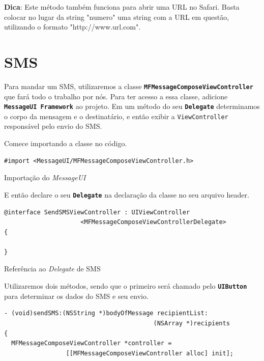 \documentclass[a4paper,12pt,brazil,doubleside]{book}
\begin{document}
\begin{singlespace}
\begin{framed}

\textbf{Dica}: Este método também funciona para abrir uma URL no Safari. Basta colocar no lugar da string "numero" uma string com a URL em questão, utilizando o formato "http://www.url.com".
\end{framed}


\section{SMS}


Para mandar um SMS, utilizaremos a classe \texttt{\textbf{MFMessageComposeViewController}} que fará todo o trabalho por nós. Para ter acesso a essa classe, adicione \texttt{\textbf{MessageUI Framework}} ao projeto. Em um método do seu \texttt{\textbf{Delegate}} determinamos o corpo da mensagem e o destinatário, e então exibir a \texttt{ViewController} responsável pelo envio do SMS.

Comece importando a classe no código.

\begin{listing}[H]
\begin{verbatim}
#import <MessageUI/MFMessageComposeViewController.h>
\end{verbatim}
\caption{Importação do \emph{MessageUI}}
\end{listing}


E então declare o seu \texttt{\textbf{Delegate}} na declaração da classe no seu arquivo header.

\begin{listing}[H]
\begin{verbatim}
@interface SendSMSViewController : UIViewController
                     <MFMessageComposeViewControllerDelegate>
{
	
}
\end{verbatim}
\caption{Referência ao \emph{Delegate} de SMS}
\end{listing}


Utilizaremos dois métodos, sendo que o primeiro será chamado pelo \texttt{\textbf{UIButton}} para determinar os dados do SMS e seu envio.

\begin{listing}[H]
\begin{verbatim}
- (void)sendSMS:(NSString *)bodyOfMessage recipientList:
                                         (NSArray *)recipients
{
  MFMessageComposeViewController *controller =
                 [[MFMessageComposeViewController alloc] init];


\end{verbatim}
\end{listing}
\end{singlespace}
\end{document}
